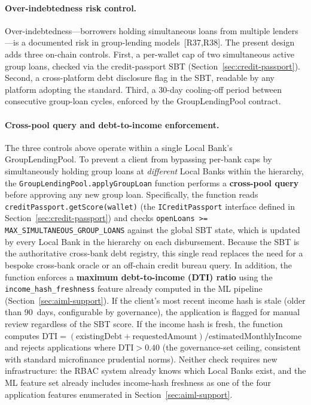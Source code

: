 \documentclass[12pt,a4paper]{report}
\begin{document}
\paragraph{Over-indebtedness risk control.}
\label{sec:over-indebt}
Over-indebtedness---borrowers holding simultaneous loans from multiple lenders---is a documented risk in group-lending models~[R37,R38]. The present design adds three on-chain controls. First, a per-wallet cap of two simultaneous active group loans, checked via the credit-passport SBT (Section~\ref{sec:credit-passport}). Second, a cross-platform debt disclosure flag in the SBT, readable by any platform adopting the standard. Third, a 30-day cooling-off period between consecutive group-loan cycles, enforced by the GroupLendingPool contract.

\paragraph{Cross-pool query and debt-to-income enforcement.}
The three controls above operate within a single Local Bank's GroupLendingPool.  To prevent a client from bypassing per-bank caps by simultaneously holding group loans at \emph{different} Local Banks within the hierarchy, the \texttt{GroupLendingPool.applyGroupLoan} function performs a \textbf{cross-pool query} before approving any new group loan.  Specifically, the function reads \texttt{creditPassport.getScore(wallet)} (the \texttt{ICreditPassport} interface defined in Section~\ref{sec:credit-passport}) and checks \texttt{openLoans >= MAX\_SIMULTANEOUS\_GROUP\_LOANS} against the global SBT state, which is updated by every Local Bank in the hierarchy on each disbursement.  Because the SBT is the authoritative cross-bank debt registry, this single read replaces the need for a bespoke cross-bank oracle or an off-chain credit bureau query.  In addition, the function enforces a \textbf{maximum debt-to-income (DTI) ratio} using the \texttt{income\_hash\_freshness} feature already computed in the ML pipeline (Section~\ref{sec:aiml-support}).  If the client's most recent income hash is stale (older than 90~days, configurable by governance), the application is flagged for manual review regardless of the SBT score.  If the income hash is fresh, the function computes $\text{DTI} = (\text{existingDebt} + \text{requestedAmount}) / \text{estimatedMonthlyIncome}$ and rejects applications where $\text{DTI} > 0.40$ (the governance-set ceiling, consistent with standard microfinance prudential norms).  Neither check requires new infrastructure: the RBAC system already knows which Local Banks exist, and the ML feature set already includes income-hash freshness as one of the four application features enumerated in Section~\ref{sec:aiml-support}.
\end{document}
